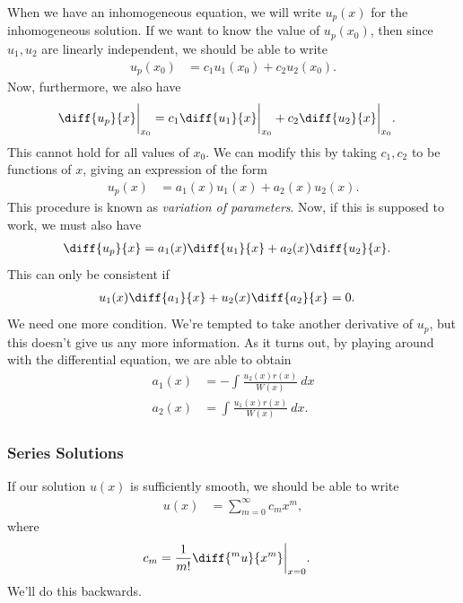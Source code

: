 \documentclass[10pt]{mypackage}
\begin{document}
  \begin{example}
    When we have an inhomogeneous equation, we will write $u_p(x)$ for the inhomogeneous solution. If we want to know the value of $u_p\left(x_0\right)$, then since $u_1,u_2$ are linearly independent, we should be able to write
    \begin{align*}
      u_p\left( x_0 \right) &= c_1u_1\left( x_0 \right) + c_2u_2\left( x_0 \right).
    \end{align*}
    Now, furthermore, we also have
    \begin{align*}
      \diff{u_p}{x}\biggr\vert_{x_0} &= c_1 \diff{u_1}{x}\biggr\vert_{x_0} + c_2 \diff{u_2}{x}\biggr\vert_{x_0}.
    \end{align*}
    This cannot hold for all values of $x_0$. We can modify this by taking $c_1,c_2$ to be functions of $x$, giving an expression of the form
    \begin{align*}
      u_p(x) &= a_1(x)u_1(x) + a_2(x)u_2(x).
    \end{align*}
    This procedure is known as \textit{variation of parameters}. Now, if this is supposed to work, we must also have
    \begin{align*}
      \diff{u_p}{x} &= a_1(x) \diff{u_1}{x} + a_2(x)\diff{u_2}{x}.
    \end{align*}
    This can only be consistent if
    \begin{align*}
      u_1(x) \diff{a_1}{x} + u_2(x)\diff{a_2}{x} &= 0.
    \end{align*}
    We need one more condition. We're tempted to take another derivative of $u_p$, but this doesn't give us any more information. As it turns out, by playing around with the differential equation, we are able to obtain
    \begin{align*}
      a_1(x) &= - \int_{}^{} \frac{u_2(x)r(x)}{W(x)}\:dx\\
      a_2(x) &= \int_{}^{} \frac{u_1(x)r(x)}{W(x)}\:dx.
    \end{align*}
    
  \end{example}
  \subsubsection{Series Solutions}%
  If our solution $u(x)$ is sufficiently smooth, we should be able to write
  \begin{align*}
    u(x) &= \sum_{m=0}^{\infty}c_mx^m,
  \end{align*}
  where
  \begin{align*}
    c_m &= \frac{1}{m!} \diff{^m u}{x^{m}}\biggr\vert_{x=0}.
  \end{align*}
  We'll do this backwards.\newline
\end{document}

